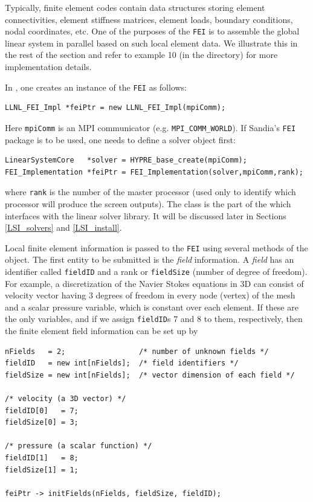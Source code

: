 Typically, finite element codes contain data structures storing element
connectivities, element stiffness matrices, element loads, boundary conditions,
nodal coordinates, etc.
One of the purposes of the {\tt FEI} is to assemble the global linear
system in parallel based on such local element data.
We illustrate this in the rest of the section and refer to example 10
(in the  directory) for more implementation details.

In \hypre{}, one creates an instance of the {\tt FEI} as follows:
\begin{display}
\begin{verbatim}
LLNL_FEI_Impl *feiPtr = new LLNL_FEI_Impl(mpiComm);
\end{verbatim}
\end{display}
Here {\tt mpiComm} is an MPI communicator (e.g. {\tt MPI\_COMM\_WORLD}).
If Sandia's {\tt FEI} package is to be used, one needs to define
a \hypre{} solver object first:
\begin{display}
\begin{verbatim}
LinearSystemCore   *solver = HYPRE_base_create(mpiComm);
FEI_Implementation *feiPtr = FEI_Implementation(solver,mpiComm,rank);
\end{verbatim}
\end{display}
where {\tt rank} is the number of the master processor (used only
to identify which processor will produce the screen outputs).
The  class is the part of the  which
interfaces with the linear solver library. It will be discussed later in
Sections \ref{LSI_solvers} and \ref{LSI_install}.

Local finite element information is passed to the {\tt FEI} using
several methods of the  object.
The first entity to be submitted is the {\it field} information. 
A {\it field} has an identifier called {\tt fieldID} and a rank or
{\tt fieldSize} (number of degree of freedom). For example, a discretization
of the Navier Stokes equations in 3D can consist of velocity vector having
$3$ degrees of freedom in every node (vertex) of the mesh and a scalar pressure
variable, which is constant over each element. If these are the only variables,
and if we assign {\tt fieldID}s $7$ and $8$ to them, respectively, then the
finite element field information can be set up by
\begin{display}
\begin{verbatim}
nFields   = 2;                 /* number of unknown fields */
fieldID   = new int[nFields];  /* field identifiers */
fieldSize = new int[nFields];  /* vector dimension of each field */

/* velocity (a 3D vector) */
fieldID[0]   = 7;
fieldSize[0] = 3;

/* pressure (a scalar function) */
fieldID[1]   = 8;
fieldSize[1] = 1;

feiPtr -> initFields(nFields, fieldSize, fieldID);
\end{verbatim}
\end{display}

